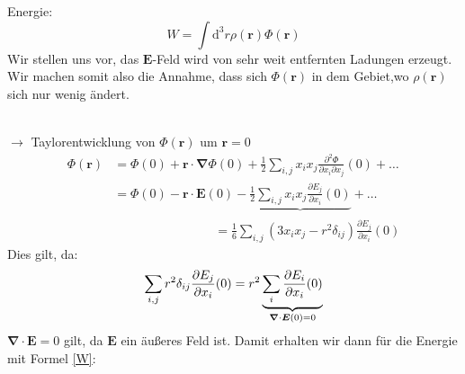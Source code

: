 \documentclass[titlepage,11pt,a4paper,ngerman]{report}
\newcommand{\tx}[1]{\textrm{#1}}
\newcommand{\dd}{\tx{d}}
\renewcommand{\Phi}{\varPhi}
\renewcommand{\vec}[1]{\boldsymbol{#1}}
\begin{document}
\begin{minipage}{.6\linewidth}
	Energie:
	\begin{equation}
	W=\int\dd^3r\rho(\vec{r})\Phi(\vec{r})
	\label{W}
	\end{equation}
	Wir stellen uns vor, das $ \vec{E} $-Feld wird von sehr weit entfernten Ladungen erzeugt. Wir machen somit also die Annahme, dass sich $\Phi(\vec{r})$ in dem Gebiet,wo $ \rho(\vec{r}) $ sich nur wenig ändert.
\end{minipage}
\begin{minipage}{.4\linewidth}
	\centering
\end{minipage}\\
$\rightarrow$ Taylorentwicklung von $\Phi(\vec{r})$ um $\vec{r}=0$\\
\begin{align*}
\Phi(\vec{r}) &= \Phi(0) + \vec{r} \cdot \vec{\nabla} \Phi(0) + \frac{1}{2} \sum_{i,j} x_i x_j \frac{\partial^2\Phi}{\partial x_i\partial x_j} (0) + \ldots \\
&= \Phi(0) - \vec{r} \cdot \vec{E} (0) - \underbrace{\frac{1}{2} \sum_{i,j} x_i x_j \frac{\partial E_j}{\partial x_i} (0)}_{} + \ldots\\
& \qquad \qquad \qquad \qquad = \frac{1}{6} \sum_{i,j} (3 x_i x_j - r^2 \delta_{ij}) \frac{\partial E_j}{\partial x_i} (0) 
\end{align*}
Dies gilt, da:
$$\sum_{i,j}r^2\delta_{ij}\frac{\partial E_j}{\partial x_i}(0)=r^2\underbrace{\sum_i\frac{\partial E_i}{\partial x_i}(0)}_{\mathclap{\vec{\nabla}\cdot\vec{E}(0)=0}}$$
$ \vec{\nabla} \cdot \vec{E} = 0 $ gilt, da $ \vec{E} $ ein äußeres Feld ist.
Damit erhalten wir dann für die Energie mit Formel \eqref{W}:
\end{document}
